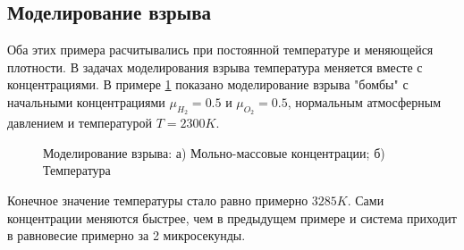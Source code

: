 \subsection{Моделирование взрыва}

Оба этих примера расчитывались при постоянной температуре и меняющейся плотности. В задачах моделирования взрыва температура меняется
вместе с концентрациями. В примере \ref{fig:bomb} показано моделирование взрыва "бомбы" с начальными концентрациями
$\mu_{H_2} = 0.5$ и $\mu_{O_2} = 0.5$, нормальным атмосферным давлением и температурой $T = 2300K$. 

\begin{figure}
    \begin{subfigure}[t]{0.45\linewidth}
        \centering
        
        \caption{}
    \end{subfigure}
    \hfill
    \begin{subfigure}[t]{0.45\linewidth}
        \centering
        
        \caption{}
    \end{subfigure}
    \hfill
    \caption{Моделирование взрыва: а) Мольно-массовые концентрации; б) Температура}
    \label{fig:bomb}
\end{figure}

Конечное значение температуры стало равно примерно $3285K$. Сами концентрации меняются быстрее, чем в предыдущем примере и система
приходит в равновесие примерно за 2 микросекунды.